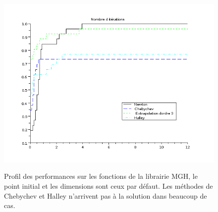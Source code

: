









\begin{figure}
\caption{Profil des performances sur les fonctions de la librairie MGH, le point initial et les dimensions sont 
ceux par d\'efaut. Les m\'ethodes de Chebychev et Halley n'arrivent pas \`a la solution dans beaucoup de cas.}\center
\includegraphics[scale=0.6]{figures/vraiesdirections.png}
\label{fig:vraies}
\end{figure}


